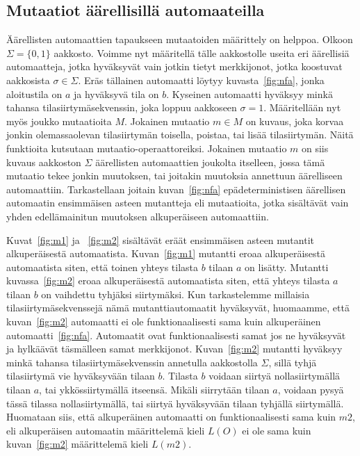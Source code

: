 \documentclass{tktltiki}
\begin{document}
\subsection{Mutaatiot äärellisillä automaateilla}
Äärellisten automaattien tapaukseen mutaatoiden määrittely on helppoa. Olkoon $\Sigma=\{0,1\}$ aakkosto. Voimme nyt määritellä tälle aakkostolle useita eri äärellisiä automaatteja, jotka hyväksyvät vain jotkin tietyt merkkijonot, jotka koostuvat aakkosista $\sigma \in \Sigma$. Eräs tällainen automaatti löytyy kuvasta~\ref{fig:nfa}, jonka aloitustila on $a$ ja hyväksyvä tila on $b$. Kyseinen automaatti hyväksyy minkä tahansa tilasiirtymäsekvenssin, joka loppuu aakkoseen $\sigma = 1$. Määritellään nyt myös joukko mutaatioita $M$. Jokainen mutaatio $m\in M$ on kuvaus, joka korvaa jonkin olemassaolevan tilasiirtymän toisella, poistaa, tai lisää tilasiirtymän. Näitä funktioita kutsutaan mutaatio-operaattoreiksi. Jokainen mutaatio $m$ on siis kuvaus aakkoston $\Sigma$ äärellisten automaattien joukolta itselleen, jossa tämä mutaatio tekee jonkin muutoksen, tai joitakin muutoksia annettuun äärelliseen automaattiin. Tarkastellaan joitain kuvan~\ref{fig:nfa} epädeterministisen äärellisen automaatin ensimmäisen asteen mutantteja eli mutaatioita, jotka sisältävät vain yhden edellämainitun muutoksen alkuperäiseen automaattiin. 

Kuvat~\ref{fig:m1} ja ~\ref{fig:m2} sisältävät eräät ensimmäisen asteen mutantit alkuperäisestä automaatista. Kuvan~\ref{fig:m1} mutantti eroaa alkuperäisestä automaatista siten, että toinen yhteys tilasta $b$ tilaan $a$ on lisätty. Mutantti kuvassa~\ref{fig:m2} eroaa alkuperäisestä automaatista siten, että yhteys tilasta $a$ tilaan $b$ on vaihdettu tyhjäksi siirtymäksi. Kun tarkastelemme millaisia tilasiirtymäsekvenssejä nämä mutanttiautomaatit hyväksyvät, huomaamme, että kuvan~\ref{fig:m2} automaatti ei ole funktionaalisesti sama kuin alkuperäinen automaatti~\ref{fig:nfa}. Automaatit ovat funktionaalisesti samat jos ne hyväksyvät ja hylkäävät täsmälleen samat merkkijonot. Kuvan~\ref{fig:m2} mutantti hyväksyy minkä tahansa tilasiirtymäsekvenssin annetulla aakkostolla $\Sigma$, sillä tyhjä tilasiirtymä vie hyväksyvään tilaan $b$. Tilasta $b$ voidaan siirtyä nollasiirtymällä tilaan $a$, tai ykkössiirtymällä itseensä. Mikäli siirrytään tilaan $a$, voidaan pysyä tässä tilassa nollasiirtymällä, tai siirtyä hyväksyvään tilaan tyhjällä siirtymällä. Huomataan siis, että alkuperäinen automaatti on funktionaalisesti sama kuin $m2$, eli alkuperäisen automaatin määrittelemä kieli $L(O)$ ei ole sama kuin kuvan~\ref{fig:m2} määrittelemä kieli $L(m2)$.
\end{document}

